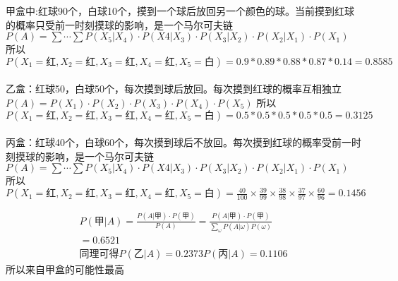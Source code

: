 \documentclass{article}
\begin{document}
    甲盒中:红球90个，白球10个，摸到一个球后放回另一个颜色的球。当前摸到红球的概率只受前一时刻摸球的影响，是一个马尔可夫链\\
    $P(A) = \sum \cdots \sum P(X_5|X_4)\cdot P(X4|X_3)\cdot P(X_3|X_2)\cdot P(X_2|X_1)\cdot P(X_1)$\\
    所以
    $$P(X_1=\text{红}, X_2 =\text{红}, X_3 = \text{红}, X_4 = \text{红}, X_5 = \text{白} )
    = 0.9 * 0.89 * 0.88 * 0.87 * 0.14 = 0.8585
    $$\\
    乙盒：红球50，白球50个，每次摸到球后放回。每次摸到红球的概率互相独立\\
    $P(A) = P(X_1) \cdot P(X_2) \cdot P(X_3) \cdot P(X_4) \cdot P(X_5)$
    所以
    $$P(X_1=\text{红}, X_2 =\text{红}, X_3 = \text{红}, X_4 = \text{红}, X_5 = \text{白} )
    = 0.5 * 0.5 * 0.5 *0.5 * 0.5 = 0.3125
    $$\\
    丙盒：红球40个，白球60个，每次摸到球后不放回。每次摸到红球的概率受前一时刻摸球的影响，是一个马尔可夫链\\
    $P(A) = \sum \cdots \sum P(X_5|X_4)\cdot P(X4|X_3)\cdot P(X_3|X_2)\cdot P(X_2|X_1)\cdot P(X_1)$\\
    所以
    $P(X_1=\text{红}, X_2 =\text{红}, X_3 = \text{红}, X_4 = \text{红}, X_5 = \text{白} )
    = \frac{40}{100} \times \frac{39}{99} \times \frac{38}{98} \times \frac{37}{97} \times \frac{60}{96}
    = 0.1456
    $

    \begin{gather*}
        P(\text{甲}|A) = \frac{P(A|\text{甲}) \cdot P(\text{甲})}{P(A)} 
        = \frac{P(A|\text{甲}) \cdot P(\text{甲}) }{\sum_{\omega} P(A|\omega) P(\omega)}\\
        = 0.6521\\
        \text{同理可得}
        P(\text{乙}|A) = 0.2373
        P(\text{丙}|A) = 0.1106
    \end{gather*}
    所以来自甲盒的可能性最高
\end{document}
